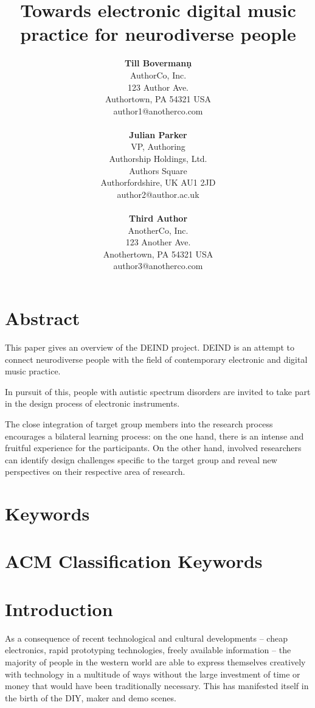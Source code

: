 \documentclass{chi-ext}
\title{Towards electronic digital music practice for neurodiverse people}
\author{
  \textbf{Till Bovermanṇ} \\
  AuthorCo, Inc. \\
  123 Author Ave. \\
  Authortown, PA 54321 USA \\
  author1@anotherco.com \\
  \\
  \textbf{Julian Parker} \\
  VP, Authoring \\
  Authorship Holdings, Ltd. \\
  Authors Square \\
  Authorfordshire, UK AU1 2JD \\
  author2@author.ac.uk \\
  \\
  \textbf{Third Author} \\
  AnotherCo, Inc. \\
  123 Another Ave. \\
  Anothertown, PA 54321 USA \\
  author3@anotherco.com \\
}
\begin{document}
\maketitle

\begin{multicols}{2}
  
\makeauthors
\makecopyright

\section{Abstract}
This paper gives an overview of the DEIND project. DEIND is an attempt to connect neurodiverse people with the field of contemporary electronic and digital music practice. 

In pursuit of this, people with autistic spectrum disorders are invited to take part in the design process of electronic instruments.

The close integration of target group members into the research process encourages a bilateral learning process: on the one hand, there is an intense and fruitful experience for the participants. On the other hand, involved researchers can identify design challenges specific to the target group and reveal new perspectives on their respective area of research.

\section{Keywords}
\makeatletter \@keywords \makeatother

\section{ACM Classification Keywords}
\makeatletter \@acmclassification \makeatother


\section{Introduction}

As a consequence of recent technological and cultural developments -- cheap electronics, rapid prototyping technologies, freely available information -- the majority of people in the western world are able to express themselves creatively with technology in a multitude of ways without the large investment of time or money that would have been traditionally necessary. 
This has manifested itself in the birth of the DIY, maker and demo scenes.


\end{multicols}
\end{document}
